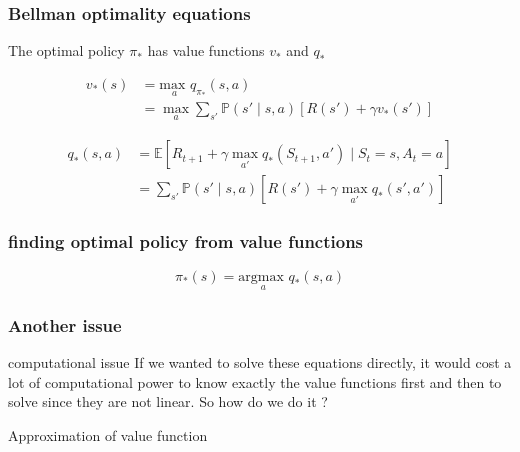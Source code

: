 \documentclass[dvipsnames,svgnames]{beamer}
\begin{document}
\begin{frame}
\frametitle{Bellman optimality equations}

The optimal policy $\pi_{*}$ has value functions  $v_*$ and $q_*$

\begin{block}{}

\begin{equation}
\begin{split}
v_{*}(s)&=\underset{a}{\text{max }} q_{\pi_{*}}(s,a)
\\&=\max_{a} \sum_{s'}\mathbb{P}(s'\mid s,a)[R(s')+\gamma v_{*}(s')]
\end{split}
\end{equation}
\end{block}

\begin{block}{}
\begin{equation}
\begin{split}
q_{*}(s,a)&=\mathbb{E}\left[ R_{t+1} + \gamma \max_{a'} q_{*}(S_{t+1},a') \mid S_t = s, A_t = a \right]
\\&= \sum_{s'}\mathbb{P}(s' \mid s,a)[R(s')+\gamma \max_{a'}q_{*}(s',a')]
\end{split}
\end{equation}
\end{block}

\end{frame}


\begin{frame}
\frametitle{finding optimal policy from value functions}
\begin{block}{}

$$\pi_{*}(s)= \underset{a}{\text{argmax }}q_*(s,a)$$
\end{block}
\end{frame}

\begin{frame}
\frametitle{Another issue}
\begin{alertblock}{computational issue}
If we wanted to solve these equations directly, it would cost a lot of computational power to know exactly the value functions first and then to solve since they are not linear. So how do we do it ? 
\end{alertblock}

\pause 
\vspace{1cm}
\centering
Approximation of value function

\end{frame}
\end{document}

